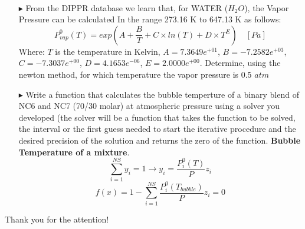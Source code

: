 \documentclass[xcolor={dvipsnames,rgb}, aspectratio=169]{beamer}
\begin{document}
\begin{frame}{}
   \begin{itemize}
      \item[$\blacktriangleright$] From the DIPPR\textsuperscript{\textregistered}
         database we learn that, for WATER ($H_{2}O$), the Vapor Pressure can be
         calculated In the range 273.16 K to 647.13 K as follows:
        \begin{equation*}
            P^{0}_{vap} (T) = exp\left(A + \frac{B}{T} + C \times ln(T) + D \times
            T^{E}\right ) \quad [Pa]
        \end{equation*}
         Where: $T$ is the temperature in Kelvin, $A = 7.3649e^{+01}$, $B =
         -7.2582e^{+03}$, $C = -7.3037e^{+00}$, $D = 4.1653e^{-06}$, $E = 2.0000e^{+00}$.
         Determine, using the newton method, for which temperature the vapor pressure is
         0.5 $atm$
   \end{itemize}
\end{frame}

\begin{frame}{}
   \begin{itemize}
      \item[$\blacktriangleright$] Write a function that calculates the bubble temperture
         of a binary blend of NC6 and NC7 (70/30 molar) at atmospheric pressure using a
         solver you developed (the solver will be a function that takes the function to
         be solved, the interval or the first guess needed to start the iterative
         procedure and the desired precision of the solution and returns the zero of the
         function. \textbf{Bubble Temperature of a mixture}.
         \begin{equation*}
            \sum_{i=1}^{NS} y_{i} = 1 \longrightarrow y_{i} = \frac{P_{i}^{0}(T)}{P}z_{i}
         \end{equation*}
         \begin{equation*}
            f(x) = 1 - \sum_{i=1}^{NS} \frac{P_{i}^{0}(T_{bubble})}{P}z_{i} = 0
         \end{equation*}
   \end{itemize}
\end{frame}

{%
\begin{frame}[standout]
	Thank you for the attention!
\end{frame}
}
\end{document}
